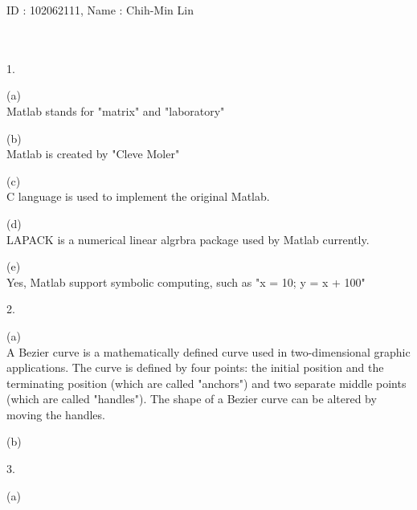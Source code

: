\documentclass{article}
\begin{document}
  \begin{enumerate*}
    \item []
    ID : 102062111, Name : Chih-Min Lin \\ \\ \\ 

    \item [1.]
    \begin{enumerate*}  
      \item [(a)] \text{}\\
      Matlab stands for "matrix" and "laboratory"
	  
      \item [(b)] \text{}\\ 
      Matlab is created by "Cleve Moler"
       
      \item [(c)] \text{}\\
      C language is used to implement the original Matlab.

      \item [(d)] \text{}\\
      LAPACK is a numerical linear algrbra package used by Matlab currently.

      \item [(e)] \text{}\\
      Yes, Matlab support symbolic computing, such as "x = 10; y = x + 100" 
    \end{enumerate*}

    \item [2.]
    \begin{enumerate*}
      \item [(a)] \text{}\\
      A Bezier curve is a mathematically defined curve used in two-dimensional graphic applications. The curve is defined by four points: the initial position and the terminating position (which are called "anchors") and two separate middle points (which are called "handles"). The shape of a Bezier curve can be altered by moving the handles.
      
      \item [(b)] \text{} \\

    \end{enumerate*}

    \item [3.]
    \begin{enumerate*}
      \item [(a)] \text{} \\
      

\end{enumerate*}
\end{enumerate*}
\end{document}
